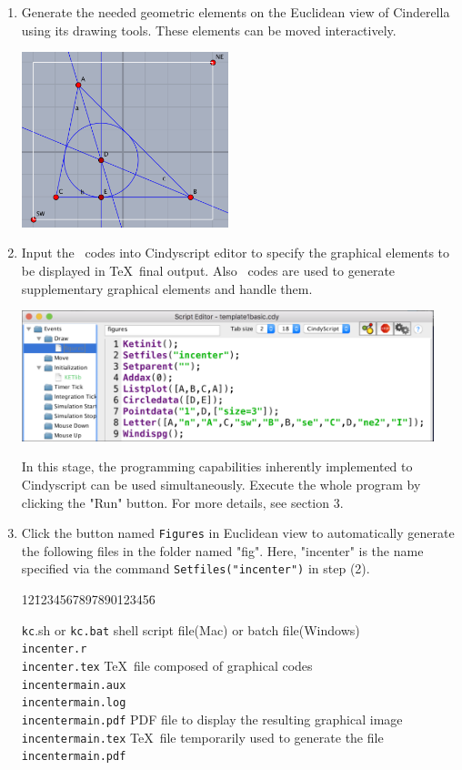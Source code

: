 \documentclass[papersize,a4paper,12pt]{article}
\begin{document}
\begin{enumerate}[(1)]
\item 
Generate the needed geometric elements 
on the Euclidean view of Cinderella 
using its drawing tools. 
These elements can be moved interactively. 

\hspace{30mm}\includegraphics[bb=0.00 0.00 408.02 347.02,width=6cm]{Fig/incenter01.pdf}

\item 
Input the \ketcindy\ codes into Cindyscript editor 
to specify the graphical elements to be displayed 
in \TeX\ final output. 
Also \ketcindy\ codes are used 
to generate supplementary graphical elements 
and handle them. 

\hspace{10mm}\includegraphics[bb=0.00 0.00 811.04 257.01,width=12cm]{Fig/incenter02E.pdf}

In this stage, the programming capabilities 
inherently implemented to Cindyscript can be used simultaneously. 
Execute the whole program by clicking the "Run" button. 
For more details, see section 3. 

\item 
Click the button named \verb|Figures| in Euclidean view 
to automatically generate the following files 
in the folder named "fig". 
Here, "incenter" is the name specified 
via the command \verb|Setfiles("incenter")| 
in step (2). 

\begin{tabbing}
12\=1234567897890123456\=\kill

 \> \verb|kc|.sh or \verb|kc.bat| \> shell script file(Mac) or batch file(Windows) \\
 \> \verb|incenter.r| \> \\
 \> \verb|incenter.tex| \> \TeX\ file composed of graphical codes\\
 \> \verb|incentermain.aux| \> \\
 \> \verb|incentermain.log| \> \\
 \> \verb|incentermain.pdf| \> PDF file to display the resulting graphical image\\
 \> \verb|incentermain.tex| \> \TeX\ file temporarily used to generate 
the file \verb|incentermain.pdf|
\end{tabbing}


\end{enumerate}
\end{document}
